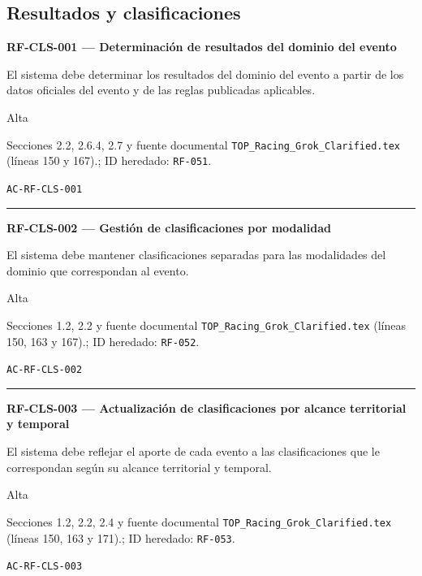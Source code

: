 \documentclass[10pt,letterpaper]{article}
\begin{document}
\subsection{Resultados y clasificaciones}
\noindent\textbf{RF-CLS-001 --- Determinación de resultados del dominio del evento}\par
\begin{description}[style=nextline,leftmargin=3.15cm,labelwidth=2.8cm,font=\normalfont\bfseries]
\item[Obligación] El sistema debe determinar los resultados del dominio del evento a partir de los datos oficiales del evento y de las reglas publicadas aplicables.
\item[Prioridad] Alta
\item[Procedencia] Secciones 2.2, 2.6.4, 2.7 y fuente documental \texttt{TOP\_Racing\_Grok\_Clarified.tex} (líneas 150 y 167).; ID heredado: \texttt{RF-051}.
\item[Verificación] \texttt{AC-RF-CLS-001}
\end{description}
\vspace{0.25em}\hrule\vspace{0.65em}
\noindent\textbf{RF-CLS-002 --- Gestión de clasificaciones por modalidad}\par
\begin{description}[style=nextline,leftmargin=3.15cm,labelwidth=2.8cm,font=\normalfont\bfseries]
\item[Obligación] El sistema debe mantener clasificaciones separadas para las modalidades del dominio que correspondan al evento.
\item[Prioridad] Alta
\item[Procedencia] Secciones 1.2, 2.2 y fuente documental \texttt{TOP\_Racing\_Grok\_Clarified.tex} (líneas 150, 163 y 167).; ID heredado: \texttt{RF-052}.
\item[Verificación] \texttt{AC-RF-CLS-002}
\end{description}
\vspace{0.25em}\hrule\vspace{0.65em}
\noindent\textbf{RF-CLS-003 --- Actualización de clasificaciones por alcance territorial y temporal}\par
\begin{description}[style=nextline,leftmargin=3.15cm,labelwidth=2.8cm,font=\normalfont\bfseries]
\item[Obligación] El sistema debe reflejar el aporte de cada evento a las clasificaciones que le correspondan según su alcance territorial y temporal.
\item[Prioridad] Alta
\item[Procedencia] Secciones 1.2, 2.2, 2.4 y fuente documental \texttt{TOP\_Racing\_Grok\_Clarified.tex} (líneas 150, 163 y 171).; ID heredado: \texttt{RF-053}.
\item[Verificación] \texttt{AC-RF-CLS-003}
\end{description}
\end{document}
